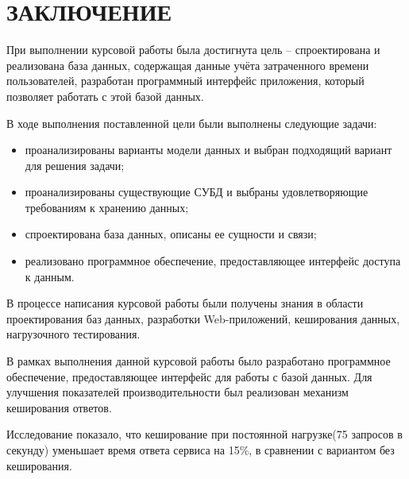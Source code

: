 \section*{ЗАКЛЮЧЕНИЕ}

При выполнении курсовой работы была достигнута цель --  спроектирована и реализована база данных, содержащая данные учёта затраченного времени пользователей, разработан программный интерфейс приложения, который позволяет работать с этой базой данных.

В ходе выполнения поставленной цели были выполнены следующие задачи:

\begin{itemize}[leftmargin=1.6\parindent]
	\item проанализированы варианты модели данных и выбран подходящий вариант для решения задачи;
	\item проанализированы существующие СУБД и выбраны удовлетворяющие требованиям к хранению данных;
	\item спроектирована база данных, описаны ее сущности и связи;
	\item реализовано программное обеспечение, предоставляющее интерфейс доступа к данным.
\end{itemize}


В процессе написания курсовой работы были получены знания в области проектирования баз данных, разработки Web-приложений, кеширования данных, нагрузочного тестирования. 

В рамках выполнения данной курсовой работы было разработано программное обеспечение, предоставляющее  интерфейс для работы с базой данных. Для улучшения показателей производительности был реализован механизм кеширования ответов.

Исследование показало, что кеширование при постоянной нагрузке(75 запросов в секунду) уменьшает время ответа сервиса на 15\%, в сравнении с вариантом без кеширования.

\pagebreak